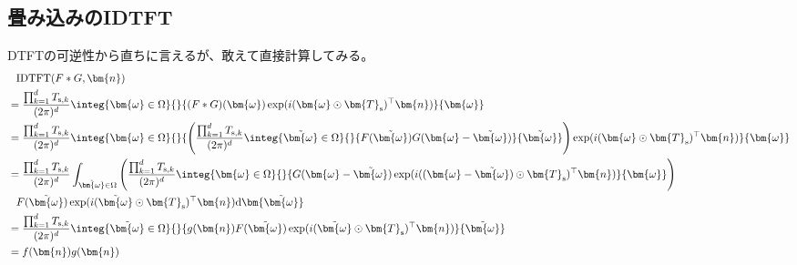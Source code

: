 				\subsection{畳み込みのIDTFT}
					DTFTの可逆性から直ちに言えるが、敢えて直接計算してみる。
					\begin{align*}
						&\phantom{=} \text{IDTFT}(F*G,\bm{n}) \\
						&= \frac{\prod_{k=1}^d T_{\text{s},k}}{(2\pi)^d}\integ{\bm{\omega}\in\Omega}{}{(F*G)(\bm{\omega})\exp(i(\bm{\omega}\odot\bm{T}_\text{s})^\top\bm{n})}{\bm{\omega}} \\
						&= \frac{\prod_{k=1}^d T_{\text{s},k}}{(2\pi)^d}\integ{\bm{\omega}\in\Omega}{}{\left(\frac{\prod_{k=1}^d T_{\text{s},k}}{(2\pi)^d}\integ{\tilde{\bm{\omega}}\in\Omega}{}{F(\tilde{\bm{\omega}})G(\bm{\omega}-\tilde{\bm{\omega}})}{\tilde{\bm{\omega}}}\right)\exp(i(\bm{\omega}\odot\bm{T}_\text{s})^\top\bm{n})}{\bm{\omega}} \\
						&=
						\frac{\prod_{k=1}^d T_{\text{s},k}}{(2\pi)^d} \int_{\tilde{\bm{\omega}}\in\Omega} \left(\frac{\prod_{k=1}^d T_{\text{s},k}}{(2\pi)^d}\integ{\bm{\omega}\in\Omega}{}{G(\bm{\omega}-\tilde{\bm{\omega}})\exp(i((\bm{\omega}-\tilde{\bm{\omega}})\odot\bm{T}_\text{s})^\top\bm{n})}{\bm{\omega}}\right) \\
						&\phantom{=} F(\tilde{\bm{\omega}})\exp(i(\tilde{\bm{\omega}}\odot\bm{T}_\text{s})^\top\bm{n})\mathrm{d}\bm{\tilde{\bm{\omega}}} \\
						&= \frac{\prod_{k=1}^d T_{\text{s},k}}{(2\pi)^d}\integ{\tilde{\bm{\omega}}\in\Omega}{}{g(\bm{n})F(\tilde{\bm{\omega}})\exp(i(\tilde{\bm{\omega}}\odot\bm{T}_\text{s})^\top\bm{n})}{\tilde{\bm{\omega}}} \\
						&= f(\bm{n})g(\bm{n})
					\end{align*}
